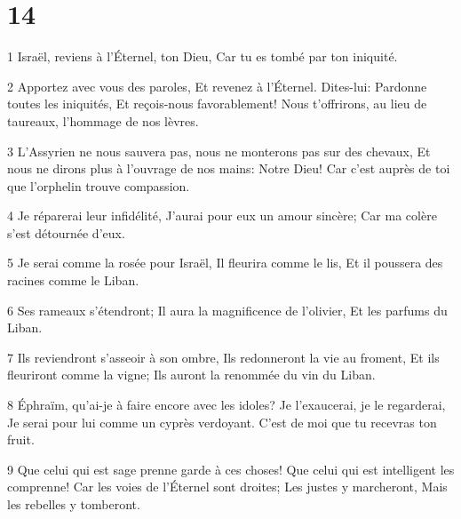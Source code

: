 \chapter{14}

\par 1 Israël, reviens à l'Éternel, ton Dieu, Car tu es tombé par ton iniquité.
\par 2 Apportez avec vous des paroles, Et revenez à l'Éternel. Dites-lui: Pardonne toutes les iniquités, Et reçois-nous favorablement! Nous t'offrirons, au lieu de taureaux, l'hommage de nos lèvres.
\par 3 L'Assyrien ne nous sauvera pas, nous ne monterons pas sur des chevaux, Et nous ne dirons plus à l'ouvrage de nos mains: Notre Dieu! Car c'est auprès de toi que l'orphelin trouve compassion.
\par 4 Je réparerai leur infidélité, J'aurai pour eux un amour sincère; Car ma colère s'est détournée d'eux.
\par 5 Je serai comme la rosée pour Israël, Il fleurira comme le lis, Et il poussera des racines comme le Liban.
\par 6 Ses rameaux s'étendront; Il aura la magnificence de l'olivier, Et les parfums du Liban.
\par 7 Ils reviendront s'asseoir à son ombre, Ils redonneront la vie au froment, Et ils fleuriront comme la vigne; Ils auront la renommée du vin du Liban.
\par 8 Éphraïm, qu'ai-je à faire encore avec les idoles? Je l'exaucerai, je le regarderai, Je serai pour lui comme un cyprès verdoyant. C'est de moi que tu recevras ton fruit.
\par 9 Que celui qui est sage prenne garde à ces choses! Que celui qui est intelligent les comprenne! Car les voies de l'Éternel sont droites; Les justes y marcheront, Mais les rebelles y tomberont.



